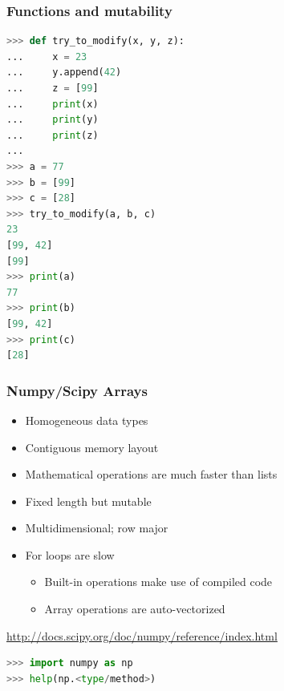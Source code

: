 \documentclass[xcolor=table,10pt,final]{beamer}
\begin{document}
\begin{frame}[fragile]
  \frametitle{Functions and mutability}
  \begin{lstlisting}[language=python]
>>> def try_to_modify(x, y, z):
...     x = 23
...     y.append(42)
...     z = [99]
...     print(x)
...     print(y)
...     print(z)
...
>>> a = 77
>>> b = [99]
>>> c = [28]
>>> try_to_modify(a, b, c)
23
[99, 42]
[99]
>>> print(a)
77
>>> print(b)
[99, 42]
>>> print(c)
[28]
  \end{lstlisting}
\end{frame}

\begin{frame}[fragile]
  \frametitle{Numpy/Scipy Arrays}
  \begin{itemize}
    \item Homogeneous data types
    \item Contiguous memory layout
    \item Mathematical operations are much faster than lists
    \item Fixed length but mutable
    \item Multidimensional; row major
    \item For loops are slow
      \begin{itemize}
        \item Built-in operations make use of compiled code
        \item Array operations are auto-vectorized
      \end{itemize}
  \end{itemize}
  \vskip0.5cm
  \url{http://docs.scipy.org/doc/numpy/reference/index.html}
  \vskip0.5cm
  \begin{lstlisting}[language=python]
>>> import numpy as np
>>> help(np.<type/method>)
  \end{lstlisting}
\end{frame}
\end{document}
